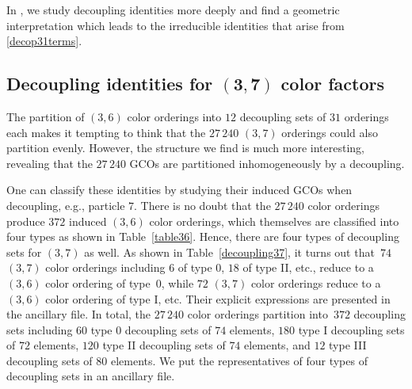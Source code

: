 \documentclass[pdftex]{sigma}
\theoremstyle{definition}
\numberwithin{equation}{section}
\begin{document}
In \cite{Cachazo:2023ltw}, we study decoupling identities more deeply and find a geometric interpretation which leads to the irreducible identities that arise from \eqref{decop31terms}.

\subsection[Decoupling identities for (3,7) color factors]{Decoupling identities for $\boldsymbol{(3,7)}$ color factors}

The partition of $(3,6)$ color orderings into $12$ decoupling sets of $31$ orderings each makes it tempting to think that the $27\,240$ $(3,7)$ orderings could also partition evenly. However, the structure we find is much more interesting, revealing that the $27\,240$ GCOs are partitioned inhomogeneously by a decoupling.

One can classify these identities by studying their induced GCOs when decoupling, e.g., particle $7$. There is no doubt that the $27\, 240$ color orderings produce $372$ induced $(3,6)$ color orderings, which themselves are classified into four types as shown in Table~\ref{table36}. Hence, there are four types of decoupling sets for $(3,7)$ as well. As shown in Table~\ref{decoupling37}, it turns out that~$74$~$(3,7)$ color orderings including $6$ of type 0, $18$ of type II, etc., reduce to a $(3,6)$ color ordering of type~0, while $72$ $(3,7)$ color orderings reduce to a $(3,6)$ color ordering of type I, etc. Their explicit expressions are presented in the ancillary file.
In total, the $27\, 240$ color orderings partition into~$372$ decoupling sets including $60$ type 0 decoupling sets of $74$ elements, $180$ type I decoupling sets of $72$ elements, $120$ type II decoupling sets of $74$ elements, and $12$ type III decoupling sets of $80$ elements. We put the representatives of four types of decoupling sets in an ancillary file.
\end{document}
